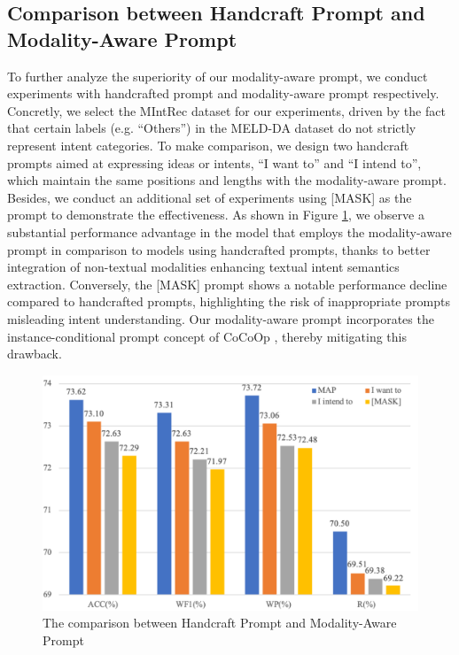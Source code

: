 \documentclass[letterpaper]{article} %
\begin{document}
\subsection{Comparison between Handcraft Prompt and Modality-Aware Prompt}
To further analyze the superiority of our modality-aware prompt, we conduct experiments with handcrafted prompt and modality-aware prompt respectively. Concretly, we select the MIntRec dataset for our experiments, driven by the fact that certain labels (e.g. ``Others'') in the MELD-DA dataset do not strictly represent intent categories. To make comparison, we design two handcraft prompts aimed at expressing ideas or intents, ``I want to'' and ``I intend to'', which maintain the same positions and lengths with the modality-aware prompt. Besides, we conduct an additional set of experiments using [MASK] as the prompt to demonstrate the effectiveness.  As shown in Figure \ref{analyze}, we observe a substantial performance advantage in the model that employs the modality-aware prompt in comparison to models using handcrafted prompts, thanks to better integration of non-textual modalities enhancing textual intent semantics extraction. Conversely, the [MASK] prompt shows a notable performance decline compared to handcrafted prompts, highlighting the risk of inappropriate prompts misleading intent understanding. Our modality-aware prompt incorporates the instance-conditional prompt concept of CoCoOp \cite{zhou2022conditional}, thereby mitigating this drawback.

\begin{figure}[t!]
\centering
\includegraphics[scale=.29,height=1.980.00.00.00.00.00.00.00.00.00.00.00.00.02in ]{Figs/analyze.pdf}
\caption{\protect \label{analyze} The comparison between Handcraft Prompt and Modality-Aware Prompt
}
\end{figure}
\end{document}
